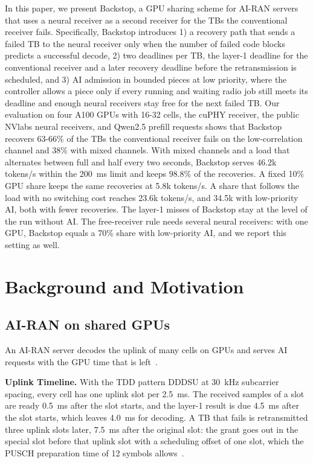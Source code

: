 \documentclass[acmsmall,screen,review,anonymous]{acmart}
\newcommand{\sys}{Backstop\xspace}
\begin{document}
In this paper, we present \sys, a GPU sharing scheme for AI-RAN servers that uses a neural receiver as a
second receiver for the TBs the conventional receiver fails. Specifically, \sys introduces 1) a recovery
path that sends a failed TB to the neural receiver only when the number of failed code blocks predicts a
successful decode, 2) two deadlines per TB, the layer-1 deadline for the conventional receiver and a later
recovery deadline before the retransmission is scheduled, and 3) AI admission in bounded pieces at low
priority, where the controller allows a piece only if every running and waiting radio job still meets its
deadline and enough neural receivers stay free for the next failed TB. Our
evaluation on four A100 GPUs with 16-32 cells, the cuPHY receiver, the public NVlabs neural receivers, and
Qwen2.5 prefill requests shows that \sys recovers 63-66\% of the TBs the conventional receiver fails on the
low-correlation channel and 38\% with mixed channels. With
mixed channels and a load that alternates between full and half every two seconds, \sys serves 46.2k
tokens/s within the 200~ms limit and keeps 98.8\% of the recoveries. A fixed 10\% GPU share keeps the same
recoveries at 5.8k tokens/s. A share that follows the load with no switching cost reaches 23.6k tokens/s,
and 34.5k with low-priority AI, both with fewer recoveries. The layer-1 misses of \sys stay at the level of
the run without AI. The free-receiver rule needs several neural receivers: with one GPU, \sys equals a
70\% share with low-priority AI, and we report this setting as well.

\section{Background and Motivation}

\subsection{AI-RAN on shared GPUs}

An AI-RAN server decodes the uplink of many cells on GPUs and serves AI requests with the GPU time that is
left~\cite{aerial,distributedairan}.

\noindent\textbf{Uplink Timeline.} With the TDD pattern DDDSU at 30~kHz subcarrier spacing, every cell has
one uplink slot per 2.5~ms. The received samples of a slot are ready 0.5~ms after the slot starts, and the
layer-1 result is due 4.5~ms after the slot starts, which leaves 4.0~ms for decoding. A TB that fails is
retransmitted three uplink slots later, 7.5~ms after the original slot: the grant goes out in the
special slot before that uplink slot with a scheduling offset of one slot, which the PUSCH preparation time
of 12 symbols allows~\cite{ts38214}.
\end{document}
